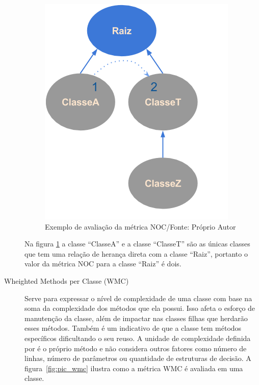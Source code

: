 \begin{description}
\begin{figure}[!ht]
	\centering
	\includegraphics[scale=0.6]{img/pic_noc.png}
	\caption{Exemplo de avaliação da métrica NOC/Fonte: Próprio Autor}
	\label{fig:pic_noc}
\end{figure}

Na figura \ref{fig:pic_noc} a classe ``ClasseA'' e a classe ``ClasseT'' são as
únicas classes que tem uma relação de herança direta com a classe ``Raiz'',
portanto o valor da métrica NOC para a classe ``Raiz'' é  dois.

 

\item[Wheighted Methods per Classe (WMC)] Serve para expressar o nível de
complexidade de uma classe com base na soma da complexidade dos métodos que ela
possui. Isso afeta o esforço de manutenção da classe, além de impactar nas
classes filhas que herdarão esses métodos. Também é um indicativo de que a
classe tem métodos específicos dificultando o seu reuso. A unidade de
complexidade definida por  é o próprio método e não
considera outros fatores como número de linhas, número de parâmetros ou
quantidade de estruturas de decisão. A figura~\ref{fig:pic_wmc} ilustra como a
métrica WMC é avaliada em uma classe.


\end{description}
